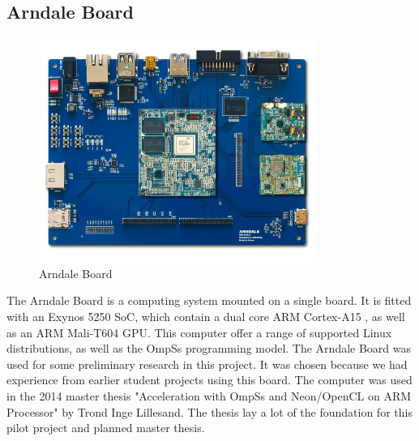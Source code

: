 \subsection{Arndale Board} \label{ArndaleBoard}
\begin{figure}[ht!]
  \centering
  \includegraphics[width=90mm]{fig/Arendale.jpg}
  \caption{Arndale Board \label{overflow}}
\end{figure}
The Arndale Board is a computing system mounted on a single board.
It is fitted with an Exynos 5250 SoC, which contain a dual core ARM Cortex-A15 , as well as an ARM Mali-T604 GPU.
This computer offer a range of supported Linux distributions, as well as the OmpSs programming model.
The Arndale Board was used for some preliminary research in this project.
It was chosen because we had experience from earlier student projects using this board.
The computer was used in the 2014 master thesis "Acceleration with OmpSs and Neon/OpenCL on ARM Processor" by Trond Inge Lillesand.
The thesis lay a lot of the foundation for this pilot project and planned master thesis.

